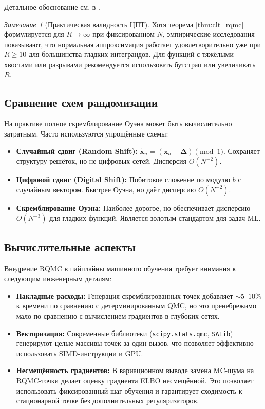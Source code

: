 \documentclass[12pt, a4paper]{article}
\theoremstyle{plain}
\theoremstyle{definition}
\theoremstyle{remark}
\newtheorem{remark}[theorem]{Замечание}
\newcommand{\vx}{\boldsymbol{x}}
\begin{document}
Детальное обоснование см. в \cite{lemieux2009monte}.

\begin{remark}[Практическая валидность ЦПТ]
    Хотя теорема \ref{thm:clt_rqmc} формулируется для $R \to \infty$ при фиксированном $N$, эмпирические исследования показывают, что нормальная аппроксимация работает удовлетворительно уже при $R \ge 10$ для большинства гладких интеграндов. Для функций с тяжёлыми хвостами или разрывами рекомендуется использовать бутстрап или увеличивать $R$.
\end{remark}

\subsection{Сравнение схем рандомизации}
На практике полное скремблирование Оуэна может быть вычислительно затратным. Часто используются упрощённые схемы:

\begin{itemize}
    \item \textbf{Случайный сдвиг (Random Shift):} $\widetilde{\vx}_n = (\vx_n + \boldsymbol{\Delta}) \pmod 1$. Сохраняет структуру решёток, но не цифровых сетей. Дисперсия $O(N^{-2})$.
    \item \textbf{Цифровой сдвиг (Digital Shift):} Побитовое сложение по модулю $b$ с случайным вектором. Быстрее Оуэна, но даёт дисперсию $O(N^{-2})$.
    \item \textbf{Скремблирование Оуэна:} Наиболее дорогое, но обеспечивает дисперсию $O(N^{-3})$ для гладких функций. Является золотым стандартом для задач ML.
\end{itemize}

\subsection{Вычислительные аспекты}
Внедрение RQMC в пайплайны машинного обучения требует внимания к следующим инженерным деталям:
\begin{itemize}
    \item \textbf{Накладные расходы:} Генерация скремблированных точек добавляет $\sim 5\text{--}10\%$ к времени по сравнению с детерминированным QMC, но это пренебрежимо мало по сравнению с вычислением градиентов в глубоких сетях.
    \item \textbf{Векторизация:} Современные библиотеки (\texttt{scipy.stats.qmc}, \texttt{SALib}) генерируют целые массивы точек за один вызов, что позволяет эффективно использовать SIMD-инструкции и GPU.
    \item \textbf{Несмещённость градиентов:} В вариационном выводе замена MC-шума на RQMC-точки делает оценку градиента ELBO несмещённой. Это позволяет использовать фиксированный шаг обучения и гарантирует сходимость к стационарной точке без дополнительных регуляризаторов.
\end{itemize}
\end{document}
